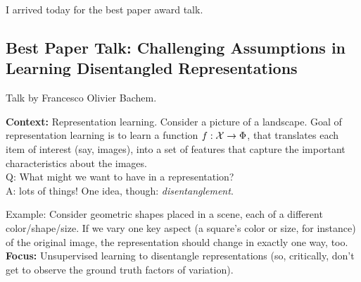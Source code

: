 I arrived today for the best paper award talk.

\subsection{Best Paper Talk: Challenging Assumptions in Learning Disentangled Representations}

Talk by Francesco Olivier Bachem. \\



{\bf Context:} Representation learning. Consider a picture of a landscape. Goal of representation learning is to learn a function $f : \mathcal{X} \rightarrow \Phi$, that translates each item of interest (say, images), into a set of features that capture the important characteristics about the images. \\

Q: What might we want to have in a representation?\\

A: lots of things! One idea, though: {\it disentanglement}. \\


Example: Consider geometric shapes placed in a scene, each of a different color/shape/size. If we vary one key aspect (a square's color or size, for instance) of the original image, the representation should change in exactly one way, too. \\

{\bf Focus:} Unsupervised learning to disentangle representations (so, critically, don't get to observe the ground truth factors of variation). \\


